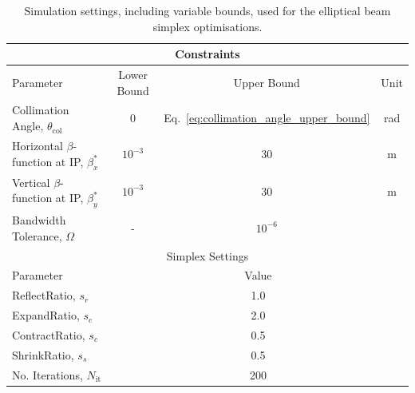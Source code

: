 \documentclass[../main.tex]{subfiles}
\begin{document}
\begin{table}[!h]
\centering
\caption{Simulation settings, including variable bounds, used for the elliptical beam simplex optimisations.}
\vspace{3mm}
\begin{tabular}{lccc}
\hline\hline
\multicolumn{4}{c}{Constraints} \\
\hline
Parameter & Lower Bound & Upper Bound & Unit \\ 
\hline
Collimation Angle, $\theta_{\mathrm{col}}$ & 0 & Eq.~\ref{eq:collimation_angle_upper_bound} & \si{\radian} \\
Horizontal $\beta$-function at IP, $\beta_{x}^{*}$ & $10^{-3}$ & 30 & \si{\meter} \\
Vertical $\beta$-function at IP, $\beta_{y}^{*}$ & $10^{-3}$ & 30 & \si{\meter} \\
Bandwidth Tolerance, $\Omega$ & - & $10^{-6}$ & \\
\hline
\multicolumn{4}{c}{Simplex Settings} \\
\hline
Parameter & \multicolumn{3}{c}{Value} \\
\hline
ReflectRatio, $s_{r}$ & \multicolumn{3}{c}{1.0} \\
ExpandRatio, $s_{e}$ & \multicolumn{3}{c}{2.0} \\
ContractRatio, $s_{c}$ & \multicolumn{3}{c}{0.5} \\
ShrinkRatio, $s_{s}$ & \multicolumn{3}{c}{0.5} \\
No. Iterations, $N_{\mathrm{it}}$ & \multicolumn{3}{c}{200} \\
\hline\hline
\end{tabular}
\label{tab:simplex_optimisation_settings}
\end{table}
\end{document}
